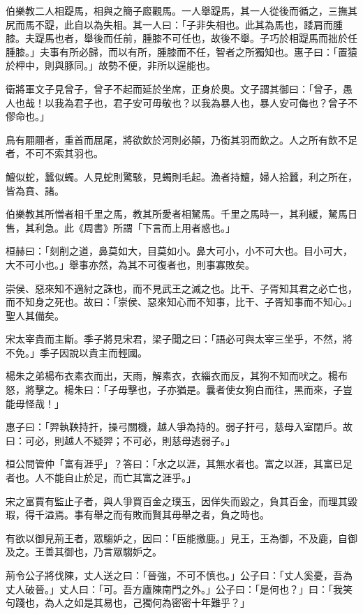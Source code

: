 
\begin{pinyinscope}
伯樂教二人相踶馬，相與之簡子廄觀馬。一人舉踶馬，其一人從後而循之，三撫其尻而馬不踶，此自以為失相。其一人曰：「子非失相也。此其為馬也，踒肩而腫膝。夫踶馬也者，舉後而任前，腫膝不可任也，故後不舉。子巧於相踶馬而拙於任腫膝。」夫事有所必歸，而以有所，腫膝而不任，智者之所獨知也。惠子曰：「置猿於柙中，則與豚同。」故勢不便，非所以逞能也。

衛將軍文子見曾子，曾子不起而延於坐席，正身於奧。文子謂其御曰：「曾子，愚人也哉！以我為君子也，君子安可毋敬也？以我為暴人也，暴人安可侮也？曾子不僇命也。」

鳥有翢翢者，重首而屈尾，將欲飲於河則必顛，乃銜其羽而飲之。人之所有飲不足者，不可不索其羽也。

鱣似蛇，蠶似蠋。人見蛇則驚駭，見蠋則毛起。漁者持鱣，婦人拾蠶，利之所在，皆為賁、諸。

伯樂教其所憎者相千里之馬，教其所愛者相駑馬。千里之馬時一，其利緩，駑馬日售，其利急。此《周書》所謂「下言而上用者惑也。」

桓赫曰：「刻削之道，鼻莫如大，目莫如小。鼻大可小，小不可大也。目小可大，大不可小也。」舉事亦然，為其不可復者也，則事寡敗矣。

崇侯、惡來知不適紂之誅也，而不見武王之滅之也。比干、子胥知其君之必亡也，而不知身之死也。故曰：「崇侯、惡來知心而不知事，比干、子胥知事而不知心。」聖人其備矣。

宋太宰貴而主斷。季子將見宋君，梁子聞之曰：「語必可與太宰三坐乎，不然，將不免。」季子因說以貴主而輕國。

楊朱之弟楊布衣素衣而出，天雨，解素衣，衣緇衣而反，其狗不知而吠之。楊布怒，將擊之。楊朱曰：「子毋擊也，子亦猶是。曩者使女狗白而往，黑而來，子豈能毋怪哉！」

惠子曰：「羿執鞅持扞，操弓關機，越人爭為持的。弱子扞弓，慈母入室閉戶。故曰：可必，則越人不疑羿；不可必，則慈母逃弱子。」

桓公問管仲「富有涯乎」？答曰：「水之以涯，其無水者也。富之以涯，其富已足者也。人不能自止於足，而亡其富之涯乎。」

宋之富賈有監止子者，與人爭買百金之璞玉，因佯失而毀之，負其百金，而理其毀瑕，得千溢焉。事有舉之而有敗而賢其毋舉之者，負之時也。

有欲以御見荊王者，眾騶妒之，因曰：「臣能撽鹿。」見王，王為御，不及鹿，自御及之。王善其御也，乃言眾騶妒之。

荊令公子將伐陳，丈人送之曰：「晉強，不可不慎也。」公子曰：「丈人奚憂，吾為丈人破晉。」丈人曰：「可。吾方廬陳南門之外。」公子曰：「是何也？」曰：「我笑句踐也，為人之如是其易也，己獨何為密密十年難乎？」


\end{pinyinscope}
